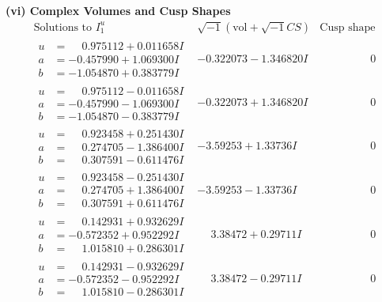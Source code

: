 \documentclass[1p]{elsarticle_modified}
\theoremstyle{definition}
\newcommand{\I}{\sqrt{-1}}
\begin{document}
\newpage\flushleft \textbf{(vi) Complex Volumes and Cusp Shapes}
$$\begin{array}{c|c|c}  
\text{Solutions to }I^u_{1}& \I (\text{vol} + \sqrt{-1}CS) & \text{Cusp shape}\\
 \hline 
\begin{aligned}
u &= \phantom{-}0.975112 + 0.011658 I \\
a &= -0.457990 + 1.069300 I \\
b &= -1.054870 + 0.383779 I\end{aligned}
 & -0.322073 - 1.346820 I & \phantom{-0.000000 } 0 \\ \hline\begin{aligned}
u &= \phantom{-}0.975112 - 0.011658 I \\
a &= -0.457990 - 1.069300 I \\
b &= -1.054870 - 0.383779 I\end{aligned}
 & -0.322073 + 1.346820 I & \phantom{-0.000000 } 0 \\ \hline\begin{aligned}
u &= \phantom{-}0.923458 + 0.251430 I \\
a &= \phantom{-}0.274705 - 1.386400 I \\
b &= \phantom{-}0.307591 - 0.611476 I\end{aligned}
 & -3.59253 + 1.33736 I & \phantom{-0.000000 } 0 \\ \hline\begin{aligned}
u &= \phantom{-}0.923458 - 0.251430 I \\
a &= \phantom{-}0.274705 + 1.386400 I \\
b &= \phantom{-}0.307591 + 0.611476 I\end{aligned}
 & -3.59253 - 1.33736 I & \phantom{-0.000000 } 0 \\ \hline\begin{aligned}
u &= \phantom{-}0.142931 + 0.932629 I \\
a &= -0.572352 + 0.952292 I \\
b &= \phantom{-}1.015810 + 0.286301 I\end{aligned}
 & \phantom{-}3.38472 + 0.29711 I & \phantom{-0.000000 } 0 \\ \hline\begin{aligned}
u &= \phantom{-}0.142931 - 0.932629 I \\
a &= -0.572352 - 0.952292 I \\
b &= \phantom{-}1.015810 - 0.286301 I\end{aligned}
 & \phantom{-}3.38472 - 0.29711 I & \phantom{-0.000000 } 0 \\ \hline\begin{aligned}

\end{aligned}
\end{array}$$
\end{document}
